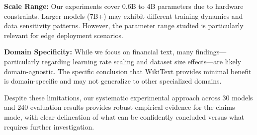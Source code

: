\textbf{Scale Range:} Our experiments cover 0.6B to 4B parameters due to hardware constraints. Larger models (7B+) may exhibit different training dynamics and data sensitivity patterns. However, the parameter range studied is particularly relevant for edge deployment scenarios.

\textbf{Domain Specificity:} While we focus on financial text, many findings—particularly regarding learning rate scaling and dataset size effects—are likely domain-agnostic. The specific conclusion that WikiText provides minimal benefit is domain-specific and may not generalize to other specialized domains.

Despite these limitations, our systematic experimental approach across 30 models and 240 evaluation results provides robust empirical evidence for the claims made, with clear delineation of what can be confidently concluded versus what requires further investigation.
